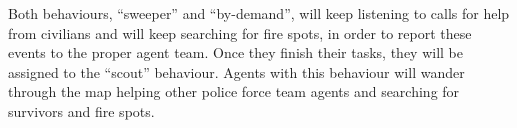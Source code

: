 Both behaviours, ``sweeper'' and ``by-demand'', will keep listening to calls for help from civilians and will keep searching for fire spots, in order to report these events to the proper agent team. Once they finish their tasks, they will be assigned to the ``scout'' behaviour. Agents with this behaviour will wander through the map helping other police force team agents and searching for survivors and fire spots.

